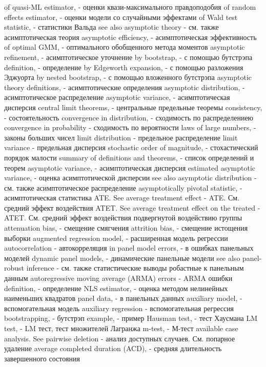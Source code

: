 of quasi-ML estimator, - оценки квази-максимального правдоподобия
of random effects estimator, - оценки модели со случайными эффектами
of Wald test statistic, - статистики Вальда
see also asymptotic theory - см. также асимптотическая теория
asymptotic efficiency, - асимптотическая эффективность
of optimal GMM, - оптимального обобщенного метода моментов
asymptotic refinement, - асимптотическое уточнение
by bootstrap, - с помощью бутстрэпа
definition, - определение
by Edgeworth expansion, - с помощью разложения Эджуорта
by nested bootstrap, - с помощью вложенного бутстрэпа
asymptotic theory definitions, - асимптотические определения
asymptotic distribution, - асимптотическое распределение
asymptotic variance, - асимптотическая дисперсия
central limit theorems, - центральные предельные теоремы
consistency, - состоятельность
convergence in distribution, - сходимость по распределениею
convergence in probability - сходимость по вероятности
laws of large numbers, - законы больших чисел
limit distribution - предельное распределение
limit variance - предельная дисперсия
stochastic order of magnitude, - стохастический порядок малости
summary of definitions and theorems, - список определений и теорем
asymptotic variance, - асимптотическая дисперсия
estimated asymptotic variance,  - оценка асимптотической дисперсии
see also asymptotic distribution - см. также асимптотическое распределение
asymptotically pivotal statistic, - асимптотическая статистика
ATE. See average treatment effect - ATE. См. средний эффект воздействия
ATET. See average treatment effect on the treated - ATET. См. средний эффект воздействия подвергнутой воздействию группы
attenuation bias, - смещение смягчения
attrition bias, - смещение истощения выборки
augmented regression model, - расширенная модель регрессии
autocorrelation - автокорреляция
in panel model errors, - в ошибках панельных моделей
dynamic panel models, - динамические панельные модели
see also panel-robust inference - см. также статистические выводы робастные к панельным данным
autoregressive moving average (ARMA) errors - ARMA ошибки
definition, - определение
NLS estimator, - оценка методом нелинейных наименьших квадратов
panel data, - в панельных данных
auxiliary model, - вспомогательная модель
auxiliary regression - вспомогательная регрессия
bootstrapping, - бутстрэп
example, - пример
Hausman test, - тест Хаусмана
LM test, - LM тест, тест множителей Лагранжа
m-test, - М-тест
available case analysis. See pairwise deletion - анализ доступных случаев. См. попарное удаление
average completed duration (ACD), - средняя длительность завершенного состояния
